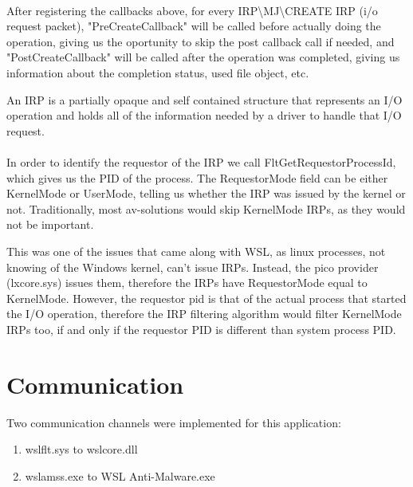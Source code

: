     \paragraph{}
    After registering the callbacks above, for every IRP\textbackslash MJ\textbackslash CREATE IRP (i/o request packet), "PreCreateCallback"
    will be called before actually doing the operation, giving us the oportunity to skip the post callback call if needed, and
    "PostCreateCallback" will be called after the operation was completed, giving us information about the completion status, used file object,
    etc.

    An IRP is a partially opaque and self contained structure that represents an I/O operation and holds all of the information needed by
    a driver to handle that I/O request.

    \paragraph{}
    In order to identify the requestor of the IRP we call FltGetRequestorProcessId, which gives us the PID of the process. The RequestorMode
    field can be either KernelMode or UserMode, telling us whether the IRP was issued by the kernel or not. Traditionally, most av-solutions
    would skip KernelMode IRPs, as they would not be important.
    
    This was one of the issues that came along with WSL, as linux processes, not knowing of the Windows kernel, can't issue IRPs. Instead,
    the pico provider (lxcore.sys) issues them, therefore the IRPs have  RequestorMode equal to KernelMode. However, the requestor pid is
    that of the actual process that started the I/O operation, therefore the IRP filtering algorithm would filter KernelMode IRPs too, if
    and only if the requestor PID is different than system process PID.

    \pagebreak

    \section{Communication}
        
        Two communication channels were implemented for this application:
        \begin{enumerate}
            \item wslflt.sys to wslcore.dll
            \item wslamss.exe to WSL Anti-Malware.exe
        \end{enumerate}

